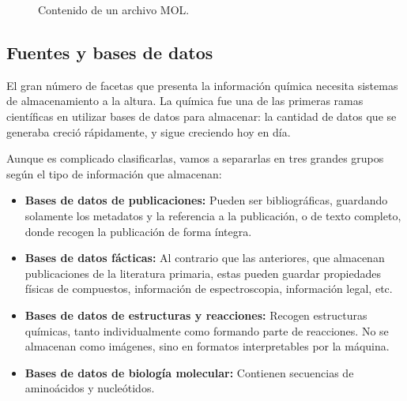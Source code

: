 \begin{figure}[H]
\centering
    \caption{Contenido de un archivo MOL. \cite{molfile_example}} 
    \label{fig:molfile}
\end{figure}


\subsection{Fuentes y bases de datos}

El gran número de facetas que presenta la información química necesita sistemas de almacenamiento a la altura. La química fue una de las primeras ramas científicas en utilizar bases de datos para almacenar: la cantidad de datos que se generaba creció rápidamente, y sigue creciendo hoy en día. 

Aunque es complicado clasificarlas, vamos a separarlas en tres grandes grupos según el tipo de información que almacenan: \cite{doi:10.1021/ci600234z}
\begin{itemize}
    \item \textbf{Bases de datos de publicaciones:} Pueden ser bibliográficas, guardando solamente los metadatos y la referencia a la publicación, o de texto completo, donde recogen la publicación de forma íntegra. %
    \item \textbf{Bases de datos fácticas:} Al contrario que las anteriores, que almacenan publicaciones de la literatura primaria, estas pueden guardar propiedades físicas de compuestos, información de espectroscopia, información legal, etc.
    \item \textbf{Bases de datos de estructuras y reacciones:} Recogen estructuras químicas, tanto individualmente como formando parte de reacciones. No se almacenan como imágenes, sino en formatos interpretables por la máquina.
    \item \textbf{Bases de datos de biología molecular:} Contienen secuencias de aminoácidos y nucleótidos.
\end{itemize}

